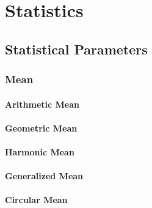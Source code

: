\section{Statistics}





\subsection{Statistical Parameters}

\subsubsection{Mean}


\paragraph{Arithmetic Mean}

\paragraph{Geometric Mean}

\paragraph{Harmonic Mean}

\paragraph{Generalized Mean}


\paragraph{Circular Mean}





